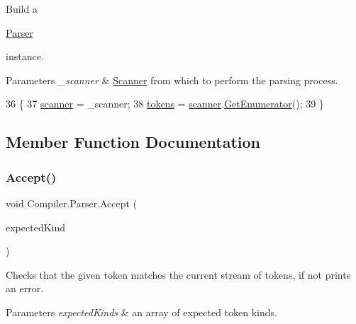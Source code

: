 Build a
\begin{DoxyCode}
\mbox{\hyperlink{class_compiler_1_1_parser_a450e11452db3f91ff866fc1e36ebc79d}{Parser}} 
\end{DoxyCode}
 instance. 
\begin{DoxyParams}{Parameters}
{\em \+\_\+scanner} & \mbox{\hyperlink{class_compiler_1_1_scanner}{Scanner}} from which to perform the parsing process. \\
\hline
\end{DoxyParams}

\begin{DoxyCode}
36                                                     \{
37                         \mbox{\hyperlink{class_compiler_1_1_parser_a022d273a476d1ce6198f601275fa9a15}{scanner}} = \_scanner;
38                         \mbox{\hyperlink{class_compiler_1_1_parser_a4db075175c853a197c7b8db7d787a0a5}{tokens}} = \mbox{\hyperlink{class_compiler_1_1_parser_a022d273a476d1ce6198f601275fa9a15}{scanner}}.\mbox{\hyperlink{class_compiler_1_1_scanner_aea1e54cd0fb8a4b19f9403be60720ff9}{GetEnumerator}}();
39                     \}
\end{DoxyCode}


\subsection{Member Function Documentation}
\mbox{\label{class_compiler_1_1_parser_aaedaac51ec193dd68541fd9d39fddde8}} 
\subsubsection{\texorpdfstring{Accept()}{Accept()}}
{\footnotesize\ttfamily void Compiler.\+Parser.\+Accept (\begin{DoxyParamCaption}\item[{\mbox{\hyperlink{namespace_compiler_a57929962f25004759596fc3f13cf563c}{Token\+Kind}}}]{expected\+Kind }\end{DoxyParamCaption})\hspace{0.3cm}{\ttfamily [protected]}}

Checks that the given token matches the current stream of tokens, if not prints an error. 
\begin{DoxyParams}{Parameters}
{\em expected\+Kinds} & an array of expected token kinds. \\
\hline
\end{DoxyParams}


